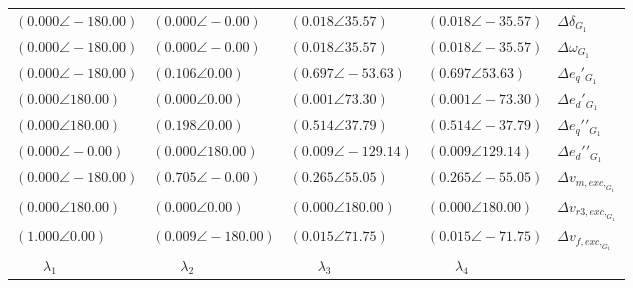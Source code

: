 \begin{tabular}{llll|l}
$(0.000 \angle -180.00)$	& $(0.000 \angle -0.00)$	& $(0.018 \angle 35.57)$	& $(0.018 \angle -35.57)$	& $\Delta\delta_{G_1}$ \\ 
$(0.000 \angle -180.00)$	& $(0.000 \angle -0.00)$	& $(0.018 \angle 35.57)$	& $(0.018 \angle -35.57)$	& $\Delta\omega_{G_1}$ \\ 
$(0.000 \angle -180.00)$	& $\mathbf{(0.106 \angle 0.00)}$	& $\mathbf{(0.697 \angle -53.63)}$	& $\mathbf{(0.697 \angle 53.63)}$	& $\Delta e_q\prime_{G_1}$ \\ 
$(0.000 \angle 180.00)$	& $(0.000 \angle 0.00)$	& $(0.001 \angle 73.30)$	& $(0.001 \angle -73.30)$	& $\Delta e_d\prime_{G_1}$ \\ 
$(0.000 \angle 180.00)$	& $\mathbf{(0.198 \angle 0.00)}$	& $\mathbf{(0.514 \angle 37.79)}$	& $\mathbf{(0.514 \angle -37.79)}$	& $\Delta e_q\prime\prime_{G_1}$ \\ 
$(0.000 \angle -0.00)$	& $(0.000 \angle 180.00)$	& $(0.009 \angle -129.14)$	& $(0.009 \angle 129.14)$	& $\Delta e_d\prime\prime_{G_1}$ \\ 
$(0.000 \angle -180.00)$	& $\mathbf{(0.705 \angle -0.00)}$	& $\mathbf{(0.265 \angle 55.05)}$	& $\mathbf{(0.265 \angle -55.05)}$	& $\Delta v_{m,exc,_{G_1}}$ \\ 
 \hline 
$(0.000 \angle 180.00)$	& $(0.000 \angle 0.00)$	& $(0.000 \angle 180.00)$	& $(0.000 \angle 180.00)$	& $\Delta v_{r3,exc,_{G_1}}$ \\ 
$\mathbf{(1.000 \angle 0.00)}$	& $(0.009 \angle -180.00)$	& $(0.015 \angle 71.75)$	& $(0.015 \angle -71.75)$	& $\Delta v_{f,exc,_{G_1}}$ \\ 
 \hline 
\hline 
$\qquad\lambda_{1}$	&$\qquad\lambda_{2}$	&$\qquad\lambda_{3}$	&$\qquad\lambda_{4}$	&
\end{tabular}

